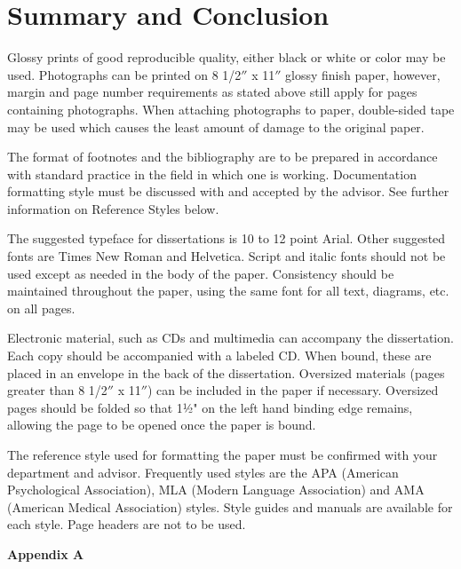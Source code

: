 \documentclass[12pt]{report}
\begin{document}
\chapter{Summary and Conclusion}

Glossy prints of good reproducible quality, either black or white or color may be used. Photographs can be printed on 8 1/2$''$ x 11$''$ glossy finish paper, however, margin and page number requirements as stated above still apply for pages containing photographs. When attaching photographs to paper, double-sided tape may be used which causes the least amount of damage to the original paper.

The format of footnotes and the bibliography are to be prepared in accordance with standard practice in the field in which one is working. Documentation formatting style must be discussed with and accepted by the advisor. See further information on Reference Styles below.

The suggested typeface for dissertations is 10 to 12 point Arial. Other suggested fonts are Times New Roman and Helvetica. Script and italic fonts should not be used except as needed in the body of the paper. Consistency should be maintained throughout the paper, using the same font for all text, diagrams, etc. on all pages.

Electronic material, such as CDs and multimedia can accompany the dissertation. Each copy should be accompanied with a labeled CD. When bound, these are placed in an envelope in the back of the dissertation.  Oversized materials (pages greater than 8 1/2$''$ x 11$''$) can be included in the paper if necessary. Oversized pages should be folded so that 1½" on the left hand binding edge remains, allowing the page to be opened once the paper is bound.

The reference style used for formatting the paper must be confirmed with your department and advisor. Frequently used styles are the APA (American Psychological Association), MLA (Modern Language Association) and AMA (American Medical Association) styles. Style guides and manuals are available for each style. Page headers are not to be used.

\newpage
{}	

\noindent \textbf{Appendix A}    %
\vspace{12pt}
\end{document}
